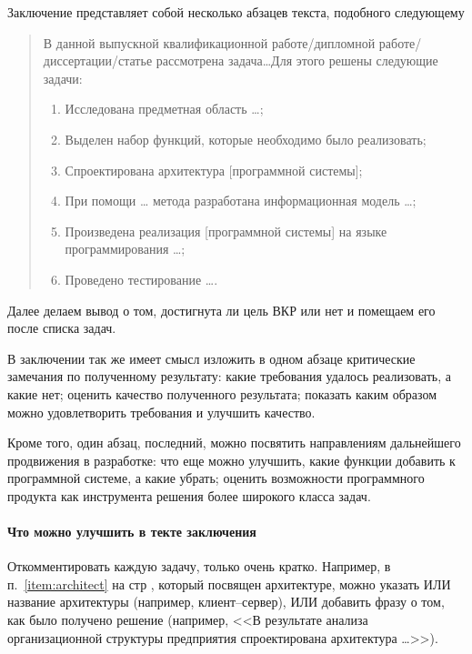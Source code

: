 \documentclass[a4paper,14pt,final]{extreport}
\begin{document}
Заключение представляет собой несколько абзацев текста, подобного следующему
\begin{quote}
В данной выпускной квалификационной работе/дипломной работе/диссертации/статье рассмотрена задача\ldots Для этого решены следующие задачи:
\begin{enumerate}
\item Исследована предметная область \ldots{};
\item Выделен набор функций, которые необходимо было реализовать;
\item Спроектирована архитектура [программной системы]; \label{item:architect}
\item При помощи \ldots{} метода разработана информационная модель \ldots{};
\item Произведена реализация [программной системы] на языке программирования \ldots{};
\item Проведено тестирование \ldots{}.
\end{enumerate}
\end{quote}

Далее делаем вывод о том, достигнута ли цель ВКР или нет и помещаем его после списка задач.

В заключении так же имеет смысл изложить в одном абзаце критические замечания по полученному результату: какие требования удалось реализовать, а какие нет; оценить качество полученного результата; показать каким образом можно удовлетворить требования и улучшить качество.

Кроме того, один абзац, последний, можно посвятить направлениям дальнейшего продвижения в разработке: что еще можно улучшить, какие функции добавить к программной системе, а какие убрать; оценить возможности программного продукта как инструмента решения более широкого класса задач.

\paragraph{Что можно улучшить в текте заключения}

Откомментировать каждую задачу, только очень кратко.  Например, в п.~\ref{item:architect} на стр \pageref{item:architect}, который посвящен архитектуре, можно указать ИЛИ название архитектуры (например, клиент--сервер), ИЛИ добавить фразу о том, как было получено решение (например, <<В результате анализа организационной структуры предприятия спроектирована архитектура \ldots{}>>).

\vspace{1em}
\end{document}
